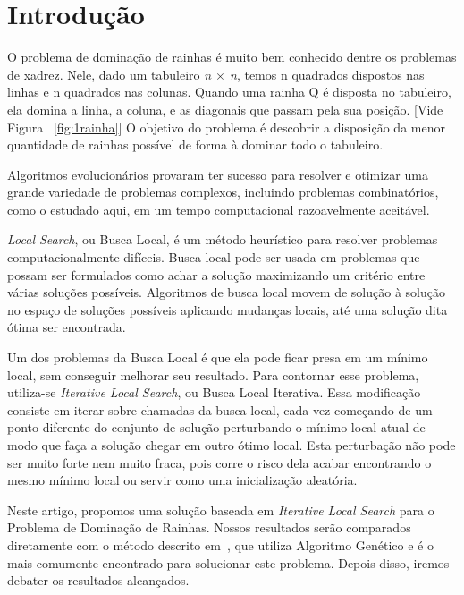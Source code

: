 \documentclass[
	article,			%
	11pt,				%
	oneside,			%
	a4paper,			%
	english,			%
	brazil,				%
	sumario=tradicional
	]{abntex2}
\begin{document}
\textual

\section{Introdução}

O problema de dominação de rainhas é muito bem conhecido dentre os problemas de xadrez. Nele, dado um tabuleiro \textit{n $\times$ n}, temos n quadrados dispostos nas linhas e n quadrados nas colunas. Quando uma rainha Q é disposta no tabuleiro, ela domina a linha, a coluna, e as diagonais que passam pela sua posição. [Vide Figura ~\ref{fig:1rainha}] O objetivo do problema é descobrir a disposição da menor quantidade de rainhas possível de forma à dominar todo o tabuleiro.

 Algoritmos evolucionários provaram ter sucesso para resolver e otimizar uma grande variedade de problemas complexos, incluindo problemas combinatórios, como o estudado aqui, em um tempo computacional razoavelmente aceitável.~\cite{doerr2011evolutionary}

\textit{Local Search}, ou Busca Local, é um método heurístico para resolver problemas computacionalmente difíceis. Busca local pode ser usada em problemas que possam ser formulados como achar a solução maximizando um critério entre várias soluções possíveis. Algoritmos de busca local movem de solução à solução no espaço de soluções possíveis aplicando mudanças locais, até uma solução dita ótima ser encontrada.~\cite{hoos2004stochastic}

Um dos problemas da Busca Local é que ela pode ficar presa em um mínimo local, sem conseguir melhorar seu resultado. Para contornar esse problema, utiliza-se \textit{Iterative Local Search}, ou Busca Local Iterativa. Essa modificação consiste em iterar sobre chamadas da busca local, cada vez começando de um ponto diferente do conjunto de solução perturbando o mínimo local atual de modo que faça a solução chegar em outro ótimo local. Esta perturbação não pode ser muito forte nem muito fraca, pois corre o risco dela acabar encontrando o mesmo mínimo local ou servir como uma inicialização aleatória.~\cite{lourencco2010iterated}

  Neste artigo, propomos uma solução baseada em \textit{Iterative Local Search} para o Problema de Dominação de Rainhas. Nossos resultados serão comparados diretamente com o método descrito em~\cite{alharbi2017genetic}, que utiliza Algoritmo Genético e é o mais comumente encontrado para solucionar este problema. Depois disso, iremos debater os resultados alcançados.
\end{document}
